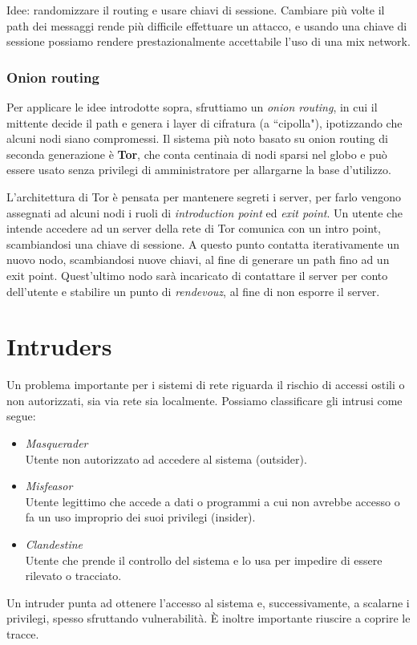 \documentclass[a4paper, 11pt, notitlepage, fleqn]{report}
\begin{document}
Idee: randomizzare il routing e usare chiavi di sessione. Cambiare più volte il path dei messaggi rende più difficile effettuare un attacco, e usando una chiave di sessione possiamo rendere prestazionalmente accettabile l'uso di una mix network.

\subsection{Onion routing}
Per applicare le idee introdotte sopra, sfruttiamo un \emph{onion routing}, in cui il mittente decide il path e genera i layer di cifratura (a ``cipolla"), ipotizzando che alcuni nodi siano compromessi.
Il sistema più noto basato su onion routing di seconda generazione è \textbf{Tor}, che conta centinaia di nodi sparsi nel globo e può essere usato senza privilegi di amministratore per allargarne la base d'utilizzo.

L'architettura di Tor è pensata per mantenere segreti i server, per farlo vengono assegnati ad alcuni nodi i ruoli di \emph{introduction point} ed \emph{exit point}. Un utente che intende accedere ad un server della rete di Tor comunica con un intro point, scambiandosi una chiave di sessione. A questo punto contatta iterativamente un nuovo nodo, scambiandosi nuove chiavi, al fine di generare un path fino ad un exit point. Quest'ultimo nodo sarà incaricato di contattare il server per conto dell'utente e stabilire un punto di \emph{rendevouz}, al fine di non esporre il server.



\chapter{Intruders}
Un problema importante per i sistemi di rete riguarda il rischio di accessi ostili o non autorizzati, sia via rete sia localmente. Possiamo classificare gli intrusi come segue:
\begin{itemize}
	\item \emph{Masquerader}\\
	Utente non autorizzato ad accedere al sistema (outsider).
	\item \emph{Misfeasor}\\
	Utente legittimo che accede a dati o programmi a cui non avrebbe accesso o fa un uso improprio dei suoi privilegi (insider).
	\item \emph{Clandestine}\\
	Utente che prende il controllo del sistema e lo usa per impedire di essere rilevato o tracciato.
\end{itemize}
Un intruder punta ad ottenere l'accesso al sistema e, successivamente, a scalarne i privilegi, spesso sfruttando vulnerabilità. \`E inoltre importante riuscire a coprire le tracce.
\end{document}
